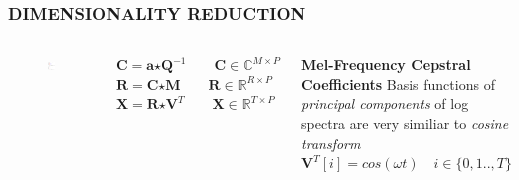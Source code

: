 \documentclass{beamer}
\begin{document}
\begin{frame}
\frametitle{DIMENSIONALITY REDUCTION}
\begin{columns}[c]
\begin{figure}
\includegraphics[width=\textwidth]{dim_2}
\end{figure}
$\textbf{C} = \textbf{a} \bm{\star} \textbf{Q}^{-1} \qquad \textbf{C} \in \mathbb{C}^{M \times P}$\\
$\textbf{R} = \textbf{C} \bm{\star} \textbf{M} \qquad \textbf{R} \in \mathbb{R}^{R \times P}$
$\textbf{X} = \textbf{R} \bm{\star} \textbf{V}^{T} \qquad \textbf{X} \in \mathbb{R}^{T \times P}$\\
\begin{block}{\textbf{Mel-Frequency Cepstral Coefficients}}
Basis functions of \textit{principal components} of log spectra are very similiar to \textit{cosine transform}\\
$\textbf{V}^{T}[i] = cos( \omega t) \quad i \in \{0,1..,T\}$
\end{block}
\end{columns}
\end{frame}
\end{document}
